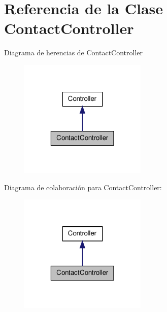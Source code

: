 \hypertarget{class_app_1_1_http_1_1_controllers_1_1_contact_controller}{\section{\-Referencia de la \-Clase \-Contact\-Controller}
\label{class_app_1_1_http_1_1_controllers_1_1_contact_controller}
}


\-Diagrama de herencias de \-Contact\-Controller
\nopagebreak
\begin{figure}[H]
\begin{center}
\leavevmode
\includegraphics[width=172pt]{class_app_1_1_http_1_1_controllers_1_1_contact_controller__inherit__graph}
\end{center}
\end{figure}


\-Diagrama de colaboración para \-Contact\-Controller\-:
\nopagebreak
\begin{figure}[H]
\begin{center}
\leavevmode
\includegraphics[width=172pt]{class_app_1_1_http_1_1_controllers_1_1_contact_controller__coll__graph}
\end{center}
\end{figure}
